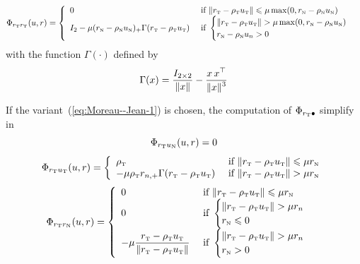 \begin{equation}
  \label{eq:Phi-AC-II-rtrt}
  \Phi_{r_\t r_\t}(u,r) =   
  \left\{
    \begin{array}{ll}
      0 & \text{ if }  \|r_{\t}  - \rho_{\t} u_{\t}\| \leq  \mu \max (0 ,r_{\n} - \rho_{\n} u_\n )  \\
      I_2-\mu(r_{\n} - \rho_{\n}u_\n )_+ \Gamma(r_{\t} - \rho_{\t} u_{\t})    &  \text{ if }
      \begin{cases}
        \|r_{\t}  - \rho_{\t} u_{\t}\| >  \mu \max (0 ,r_{\n} - \rho_{\n} u_\n )  \\
        r_{\n} - \rho_{\n} u_n > 0
      \end{cases} \\
    \end{array}\right. 
\end{equation}
with 
 the function $\Gamma(\cdot)$  defined by
\begin{equation}
  \label{eq:AC-L12}
  \Gamma(x) = \Frac{I_{2\times 2}}{\|x\|} - \Frac{x\,x^\top}{\|x\|^3}
\end{equation}

If the variant~(\ref{eq:Moreau--Jean-1}) is chosen, the computation of $\Phi_{r_{\hbox{\tiny{T}}} \bullet}$  simplify in
\begin{equation}
  \label{eq:Phi-CKPS-II-rtun}
  \Phi_{r_\t u_\n}(u,r) =   0
\end{equation}
\begin{equation}
  \label{eq:Phi-CKPS-II-rtut}
  \Phi_{r_\t u_\t}(u,r) =   
  \left\{
    \begin{array}{ll}
      \rho_{\t} & \text{ if }  \|r_{\t}  - \rho_{\t} u_{\t}\| \leq  \mu r_\n  \\
      -\mu\rho_\t r_{n,+} \Gamma(r_\t-\rho_\t u_\t) & \text{ if }
      \|r_{\t}  - \rho_{\t} u_{\t}\| >  \mu r_\n  \\
    \end{array}\right. 
\end{equation}
\begin{equation}
  \label{eq:Phi-CKPS-II-rtrn}
  \Phi_{r_\t r_\n}(u,r) =   
  \left\{
    \begin{array}{ll}
      0 & \text{ if }  \|r_{\t}  - \rho_{\t} u_{\t}\| \leq  \mu r_{\n}  \\
      0 & \text{ if }
      \begin{cases}
        \|r_{\t}  - \rho_{\t} u_{\t}\| >  \mu r_n  \\
        r_{\n} \leq 0
      \end{cases} \\
       -\mu  \Frac{r_{\t} - \rho_{\t} u_{\t} }{ \| r_{\t} - \rho_{\t} u_{\t}\| }  &  \text{ if }
      \begin{cases}
        \|r_{\t}  - \rho_{\t} u_{\t}\| >  \mu r_n  \\
        r_{\n}  > 0
      \end{cases} \\
    \end{array}\right. 
\end{equation}

